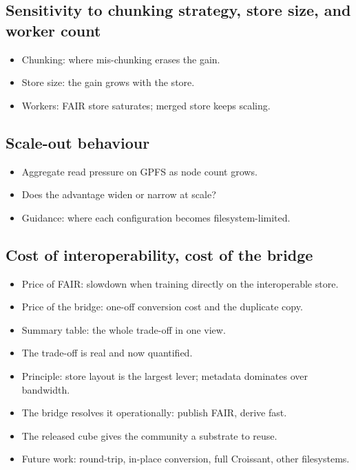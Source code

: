 \documentclass[gmd, manuscript]{copernicus}
\begin{document}
\subsection{Sensitivity to chunking strategy, store size, and worker count}
\begin{itemize}
\item Chunking: where mis-chunking erases the gain.
\item Store size: the gain grows with the store.
\item Workers: FAIR store saturates; merged store keeps scaling.
\end{itemize}
\subsection{Scale-out behaviour}
\begin{itemize}
\item Aggregate read pressure on GPFS as node count grows.
\item Does the advantage widen or narrow at scale?
\item Guidance: where each configuration becomes filesystem-limited.
\end{itemize}
\subsection{Cost of interoperability, cost of the bridge}
\begin{itemize}
\item Price of FAIR: slowdown when training directly on the interoperable store.
\item Price of the bridge: one-off conversion cost and the duplicate copy.
\item Summary table: the whole trade-off in one view.
\end{itemize}

\conclusions  %
\begin{itemize}
\item The trade-off is real and now quantified.
\item Principle: store layout is the largest lever; metadata dominates over bandwidth.
\item The bridge resolves it operationally: publish FAIR, derive fast.
\item The released cube gives the community a substrate to reuse.
\item Future work: round-trip, in-place conversion, full Croissant, other filesystems.
\end{itemize}
\end{document}
